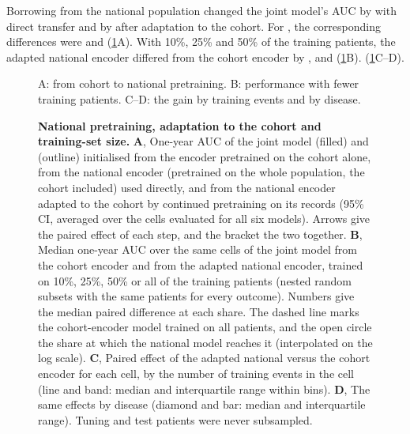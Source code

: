 Borrowing from the national population changed the joint model's AUC by
 with direct transfer and by  after
adaptation to the cohort. For \opera{}, the corresponding differences were
 and  (\cref{fig:encoder-transfer}A).
With 10\%, 25\% and 50\% of the training patients, the adapted national encoder
differed from the cohort encoder by ,  and
 (\cref{fig:encoder-transfer}B). 
(\cref{fig:encoder-transfer}C--D).

\begin{figure}[H]
    {A: from cohort to national pretraining. B: performance with fewer training
    patients. C--D: the gain by training events and by disease.}
  \caption{\textbf{National pretraining, adaptation to the cohort and
  training-set size.} \textbf{A}, One-year AUC of the joint model (filled) and \opera{}
  (outline) initialised from the encoder pretrained on the cohort alone, from
  the national encoder (pretrained on the whole population, the cohort
  included) used directly, and from the national encoder adapted to the cohort
  by continued pretraining on its records (95\% CI,
  averaged over the cells evaluated for all six models). Arrows give the paired
  effect of each step, and the bracket the two together. \textbf{B}, Median
  one-year AUC over the same cells of the joint model from the cohort encoder
  and from the adapted national encoder, trained on 10\%, 25\%, 50\% or all of
  the training patients (nested random subsets with the same patients for every
  outcome). Numbers give the median paired difference at each share. The dashed
  line marks the cohort-encoder model trained on all patients, and the open circle the
  share at which the national model reaches it (interpolated on the log scale).
  \textbf{C}, Paired effect of the adapted national versus the cohort encoder
  for each cell, by the number of training events in the cell (line and band:
  median and interquartile range within bins). \textbf{D}, The same effects by
  disease (diamond and bar: median and interquartile range). Tuning and
  test patients were never subsampled.}
  \label{fig:encoder-transfer}
\end{figure}

